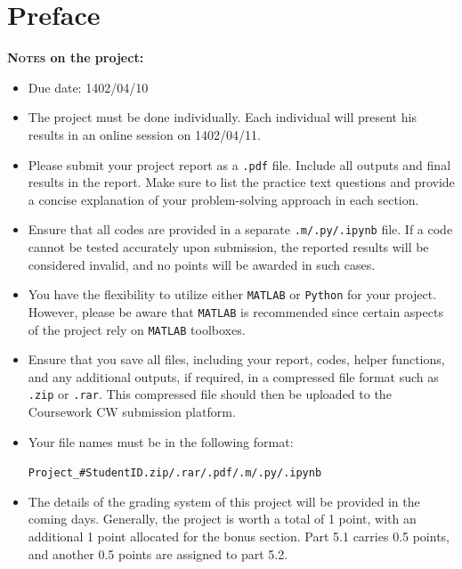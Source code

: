 \documentclass[12pt]{article}
\begin{document}
\thispagestyle{empty}

\setcounter{page}{0}

\newpage
\section*{Preface}
\textbf{\textsc{Notes} on the project:}
\begin{itemize}
	\item Due date: 1402/04/10 \medskip

	\item The project must be done individually. Each individual will present his results in an online session on 1402/04/11. \medskip

	\item Please submit your project report as a \texttt{.pdf} file. Include all outputs and final results in the report. Make sure to list the practice text questions and provide a concise explanation of your problem-solving approach in each section. \medskip

	\item Ensure that all codes are provided in a separate \texttt{.m/.py/.ipynb} file. If a code cannot be tested accurately upon submission, the reported results will be considered invalid, and no points will be awarded in such cases.\medskip

	\item You have the flexibility to utilize either \texttt{MATLAB} or \texttt{Python} for your project. However, please be aware that \texttt{MATLAB} is recommended since certain aspects of the project rely on \texttt{MATLAB} toolboxes.

	\item Ensure that you save all files, including your report, codes, helper functions, and any additional outputs, if required, in a compressed file format such as \texttt{.zip} or \texttt{.rar}. This compressed file should then be uploaded to the Coursework CW submission platform. \medskip

	\item Your file names must be in the following format: \begin{center}
		      \texttt{Project\_\#StudentID.zip/.rar/.pdf/.m/.py/.ipynb}
	      \end{center}
	      \medskip

	\item The details of the grading system of this project will be provided in the coming days. Generally, the project is worth a total of 1 point, with an additional 1 point allocated for the bonus section. Part 5.1 carries 0.5 points, and another 0.5 points are assigned to part 5.2. \medskip


\end{itemize}
\end{document}
